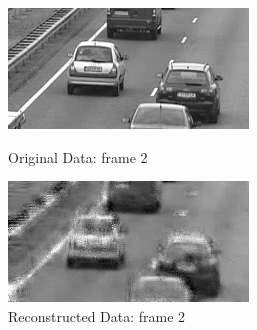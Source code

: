 \documentclass[12pt]{article}
\begin{document}
\begin{itemize}
\begin{enumerate}
    \begin{figure}[H]
        \centering
        \begin{minipage}{.45\textwidth}
            \centering
            \includegraphics[width=\linewidth]{results/cars_7_orig_2.png}
            \caption*{Original Data: frame 2}
        \end{minipage}
        \begin{minipage}{.45\textwidth}
            \centering
            \includegraphics[width=\linewidth]{results/cars_7_recon_2.png}
            \caption*{Reconstructed Data: frame 2}
        \end{minipage}
    \end{figure}


\end{enumerate}
\end{itemize}
\end{document}
